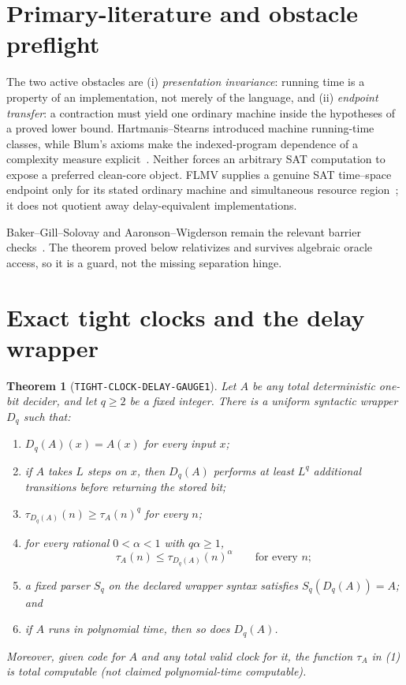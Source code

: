 \documentclass[11pt]{article}
\newtheorem{theorem}{Theorem}
\begin{document}
\section{Primary-literature and obstacle preflight}

The two active obstacles are (i) \emph{presentation invariance}: running time
is a property of an implementation, not merely of the language, and
(ii) \emph{endpoint transfer}: a contraction must yield one ordinary machine
inside the hypotheses of a proved lower bound.  Hartmanis--Stearns introduced
machine running-time classes, while Blum's axioms make the indexed-program
dependence of a complexity measure explicit~\cite{HS65,Blum67}.  Neither
forces an arbitrary SAT computation to expose a preferred clean-core object.
FLMV supplies a genuine SAT time--space endpoint only for its stated ordinary
machine and simultaneous resource region~\cite{FLMV05}; it does not quotient
away delay-equivalent implementations.

Baker--Gill--Solovay and Aaronson--Wigderson remain the relevant barrier
checks~\cite{BGS75,AW09}.  The theorem proved below relativizes and survives
algebraic oracle access, so it is a guard, not the missing separation hinge.

\section{Exact tight clocks and the delay wrapper}

\begin{theorem}[\texttt{TIGHT-CLOCK-DELAY-GAUGE1}]              \label{thm:gauge}
Let $A$ be any total deterministic one-bit decider, and let $q\ge2$ be a
fixed integer.  There is a uniform syntactic wrapper $D_q$ such that:
\begin{enumerate}[label=(\roman*),leftmargin=1.7em]
\item $D_q(A)(x)=A(x)$ for every input $x$;
\item if $A$ takes $L$ steps on $x$, then $D_q(A)$ performs at least $L^q$
      additional transitions before returning the stored bit;
\item $\tau_{D_q(A)}(n)\ge\tau_A(n)^q$ for every $n$;
\item for every rational $0<\alpha<1$ with $q\alpha\ge1$,
\[
                  \tau_A(n)\le \tau_{D_q(A)}(n)^\alpha
                  \qquad\text{for every }n;                  \tag{2}
\]
\item a fixed parser $S_q$ on the declared wrapper syntax satisfies
      $S_q(D_q(A))=A$; and
\item if $A$ runs in polynomial time, then so does $D_q(A)$.
\end{enumerate}
Moreover, given code for $A$ and any total valid clock for it, the function
$\tau_A$ in (1) is total computable (not claimed polynomial-time computable).
\end{theorem}
\end{document}

